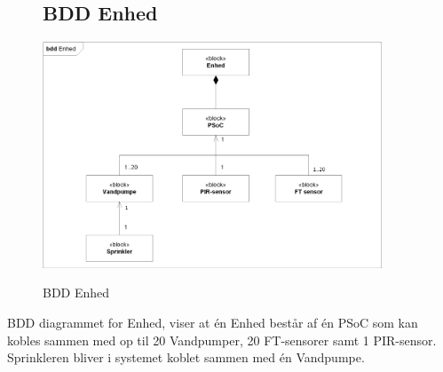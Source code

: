 \begin{figure}[H] \centering
\subsection{BDD Enhed}
{\includegraphics[width=0.9\textwidth]{filer/systemarkitektur/BDD_Enhed}}
\caption{BDD Enhed}
\label{lab:bddenhed}
\raggedright
\end{figure}

BDD diagrammet for Enhed, viser at én Enhed består af én PSoC som kan kobles sammen med op til 20 Vandpumper, 20 FT-sensorer samt 1 PIR-sensor. Sprinkleren bliver i systemet koblet sammen med én Vandpumpe.


